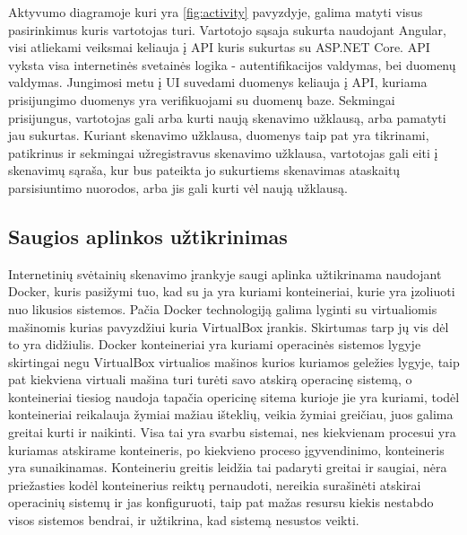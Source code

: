 \documentclass[a4paper,12pt,fleqn]{article}
\begin{document}
Aktyvumo diagramoje kuri yra \ref{fig:activity} pavyzdyje, galima matyti visus pasirinkimus kuris vartotojas turi. Vartotojo sąsaja sukurta naudojant Angular, visi atliekami veiksmai keliauja į API kuris sukurtas su ASP.NET Core. API vyksta visa internetinės svetainės logika - autentifikacijos valdymas, bei duomenų valdymas. Jungimosi metu į UI suvedami duomenys keliauja į API, kuriama prisijungimo duomenys yra verifikuojami su duomenų baze. Sekmingai prisijungus, vartotojas gali arba kurti naują skenavimo užklausą, arba pamatyti jau sukurtas. Kuriant skenavimo užklausa, duomenys taip pat yra tikrinami, patikrinus ir sekmingai užregistravus skenavimo užklausa, vartotojas gali eiti į skenavimų sąraša, kur bus pateikta jo sukurtiems skenavimas ataskaitų parsisiuntimo nuorodos, arba jis gali kurti vėl naują užklausą.

\subsection{Saugios aplinkos užtikrinimas}
\label{sec:safe}

Internetinių svėtainių skenavimo įrankyje saugi aplinka užtikrinama naudojant Docker, kuris pasižymi tuo, kad su ja yra kuriami konteineriai, kurie yra įzoliuoti nuo likusios sistemos. Pačia Docker technologiją galima lyginti su virtualiomis mašinomis kurias pavyzdžiui kuria VirtualBox įrankis. Skirtumas tarp jų vis dėl to yra didžiulis. Docker konteineriai yra kuriami operacinės sistemos lygyje skirtingai negu VirtualBox virtualios mašinos kurios kuriamos geležies lygyje, taip pat kiekviena virtuali mašina turi turėti savo atskirą operacinę sistemą, o konteineriai tiesiog naudoja tapačia opericinę sitema kurioje jie yra kuriami, todėl konteineriai reikalauja žymiai mažiau išteklių, veikia žymiai greičiau, juos galima greitai kurti ir naikinti\cite{merkel2014docker}. Visa tai yra svarbu sistemai, nes kiekvienam procesui yra kuriamas atskirame konteineris, po kiekvieno proceso įgyvendinimo, konteineris yra sunaikinamas. Konteineriu greitis leidžia tai padaryti greitai ir saugiai, nėra priežasties kodėl konteinerius reiktų pernaudoti, nereikia surašinėti atskirai operacinių sistemų ir jas konfiguruoti, taip pat mažas resursu kiekis nestabdo visos sistemos bendrai, ir užtikrina, kad sistemą nesustos veikti.
\end{document}
